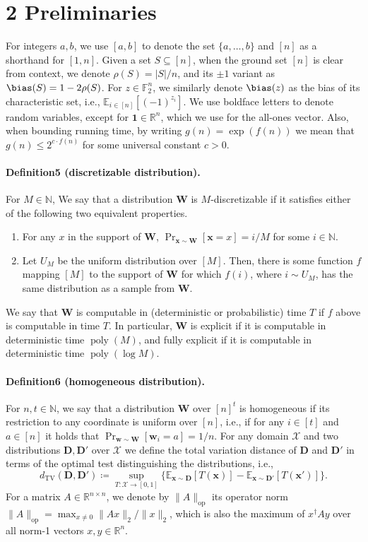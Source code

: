 \section*{2 Preliminaries}
For integers $a,b$, we use $[a,b]$ to denote the set $\{a,\ldots,b\}$ and $[n]$ as a shorthand for $[1,n]$. Given a set $S\subseteq[n]$, when the ground set $[n]$ is clear from context, we denote $\rho(S)=|S|/n$, and its $\pm1$ variant as $\bias(S)=1-2\rho(S)$. For $z\in\mathbb F_2^n$, we similarly denote $\bias(z)$ as the bias of its characteristic set, i.e., $\mathbb E_{i\in[n]}[(-1)^{z_i}]$. We use boldface letters to denote random variables, except for $\mathbf1\in\mathbb R^n$, which we use for the all-ones vector. Also, when bounding running time, by writing $g(n)=\exp(f(n))$ we mean that $g(n)\leq2^{c\cdot f(n)}$ for some universal constant $c>0$.
\paragraph{Definition5 (discretizable distribution).} For $M\in\mathbb N$, We say that a distribution $\mathbf W$ is $M$-discretizable if it satisfies either of the following two equivalent properties.
\begin{enumerate}
\item For any $x$ in the support of $\mathbf W$, $\Pr_{\mathbf x\sim\mathbf W}[\mathbf x=x]=i/M$ for some $i\in\mathbb N$.
\item Let $U_M$ be the uniform distribution over $[M]$. Then, there is some function $f$ mapping $[M]$ to the support of $\mathbf W$ for which $f(i)$, where $i\sim U_M$, has the same distribution as a sample from $\mathbf W$.
\end{enumerate}
We say that $\mathbf W$ is computable in (deterministic or probabilistic) time $T$ if $f$ above is computable in time $T$. In particular, $\mathbf W$ is explicit if it is computable in deterministic time $\operatorname{poly}(M)$, and fully explicit if it is computable in deterministic time $\operatorname{poly}(\log M)$.
\paragraph{Definition6 (homogeneous distribution).} For $n,t\in\mathbb N$, we say that a distribution $\mathbf W$ over $[n]^t$ is homogeneous if its restriction to any coordinate is uniform over $[n]$, i.e., if for any $i\in[t]$ and $a\in[n]$ it holds that $\Pr_{\mathbf w\sim\mathbf W}[\mathbf w_i=a]=1/n$.
For any domain $\mathcal X$ and two distributions $\mathbf D,\mathbf D'$ over $\mathcal X$ we define the total variation distance of $\mathbf D$ and $\mathbf D'$ in terms of the optimal test distinguishing the distributions, i.e.,
\[d_{\mathrm{TV}}(\mathbf D,\mathbf D')\coloneqq\sup_{T:\mathcal X\to[0,1]}\{\mathbb E_{\mathbf x\sim\mathbf D}[T(\mathbf x)]-\mathbb E_{\mathbf x\sim\mathbf D'}[T(\mathbf x')]\}.\]
For a matrix $A\in\mathbb R^{n\times n}$, we denote by $\|A\|_{\mathrm{op}}$ its operator norm $\|A\|_{\mathrm{op}}=\max_{x\neq0}\|Ax\|_2/\|x\|_2$, which is also the maximum of $x^{\dagger}Ay$ over all norm-1 vectors $x,y\in\mathbb R^n$.
